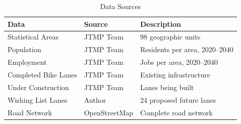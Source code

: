 \begin{table}[H]
\centering
\caption{Data Sources}
\label{tab:data_sources}
\begin{tabular}{@{}lll@{}}
\toprule
\textbf{Data} & \textbf{Source} & \textbf{Description} \\
\midrule
Statistical Areas & JTMP Team & 98 geographic units \\
Population & JTMP Team & Residents per area, 2020--2040 \\
Employment & JTMP Team & Jobs per area, 2020--2040 \\
Completed Bike Lanes & JTMP Team & Existing infrastructure \\
Under Construction & JTMP Team & Lanes being built \\
Wishing List Lanes & Author & 24 proposed future lanes \\
Road Network & OpenStreetMap & Complete road network \\
\bottomrule
\end{tabular}
\end{table}
